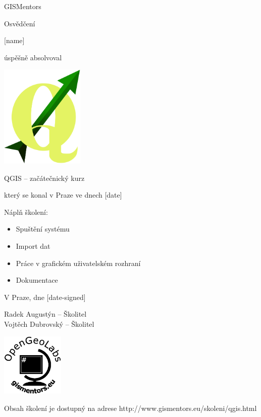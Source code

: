 \documentclass[12pt, a4paper]{letter}
\begin{document}
\pagestyle{empty}
\begin{center}

{\Large GISMentors}

{\Huge Osvědčení}

{\Large [name]}

úspěšně absolvoval

\includegraphics[width=0.30\textwidth]{../images/qgislogo_vector.eps}

{\Large QGIS -- začátečnický kurz}

který se konal v Praze ve dnech [date]
\end{center}

Náplň školení:

\begin{itemize}
    \item Spuštění systému
    \item Import dat
    \item Práce v grafickém uživatelském rozhraní
    \item Dokumentace
\end{itemize}

\vfill
\parbox{7cm}{

    V Praze, dne [date-signed]\\

\vfill

    Radek Augustýn -- Školitel\\

\vfill
    Vojtěch Dubrovský -- Školitel
}
\hfill
\parbox{3cm}{
    \includegraphics[width=3cm]{../images/placka.eps}
}


\begin{center}
{\footnotesize Obsah školení je dostupný na adrese
http://www.gismentors.eu/skoleni/qgis.html}
\end{center}
\end{document}
